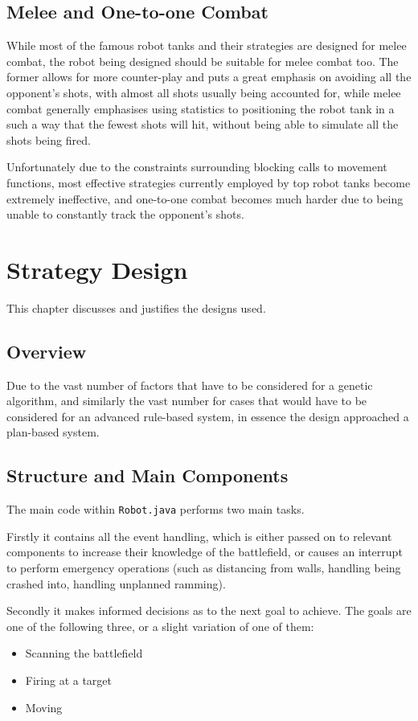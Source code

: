 \documentclass[11pt]{report}
\begin{document}
\section{Melee and One-to-one Combat}
While most of the famous robot tanks and their strategies are designed for melee combat, the robot being designed should be suitable for melee combat too. The former allows for more counter-play and puts a great emphasis on avoiding all the opponent's shots, with almost all shots usually being accounted for, while melee combat generally emphasises using statistics to positioning the robot tank in a such a way that the fewest shots will hit, without being able to simulate all the shots being fired.

Unfortunately due to the constraints surrounding blocking calls to movement functions, most effective strategies currently employed by top robot tanks become extremely ineffective, and one-to-one combat becomes much harder due to being unable to constantly track the opponent's shots.


\chapter{Strategy Design} %
This chapter discusses and justifies the designs used.

\section{Overview}
Due to the vast number of factors that have to be considered for a genetic algorithm, and similarly the vast number for cases that would have to be considered for an advanced rule-based system, in essence the design approached a plan-based system.

\section{Structure and Main Components}
The main code within \texttt{Robot.java} performs two main tasks.

Firstly it contains all the event handling, which is either passed on to relevant components to increase their knowledge of the battlefield, or causes an interrupt to perform emergency operations (such as distancing from walls, handling being crashed into, handling unplanned ramming).

Secondly it makes informed decisions as to the next goal to achieve. The goals are one of the following three, or a slight variation of one of them:
\begin{itemize}
	\item Scanning the battlefield
	\item Firing at a target
	\item Moving
\end{itemize}
\end{document}
